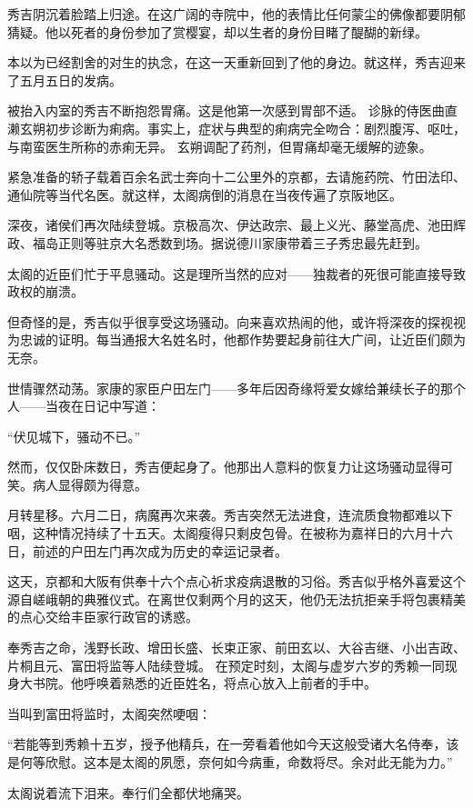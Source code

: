 \documentclass[
]{book}
\begin{document}
秀吉阴沉着脸踏上归途。在这广阔的寺院中，他的表情比任何蒙尘的佛像都要阴郁猜疑。他以死者的身份参加了赏樱宴，却以生者的身份目睹了醍醐的新绿。

本以为已经割舍的对生的执念，在这一天重新回到了他的身边。就这样，秀吉迎来了五月五日的发病。

被抬入内室的秀吉不断抱怨胃痛。这是他第一次感到胃部不适。
诊脉的侍医曲直濑玄朔初步诊断为痢病。事实上，症状与典型的痢病完全吻合：剧烈腹泻、呕吐，与南蛮医生所称的赤痢无异。
玄朔调配了药剂，但胃痛却毫无缓解的迹象。

紧急准备的轿子载着百余名武士奔向十二公里外的京都，去请施药院、竹田法印、通仙院等当代名医。就这样，太阁病倒的消息在当夜传遍了京阪地区。

深夜，诸侯们再次陆续登城。京极高次、伊达政宗、最上义光、藤堂高虎、池田辉政、福岛正则等驻京大名悉数到场。据说德川家康带着三子秀忠最先赶到。

太阁的近臣们忙于平息骚动。这是理所当然的应对------独裁者的死很可能直接导致政权的崩溃。

但奇怪的是，秀吉似乎很享受这场骚动。向来喜欢热闹的他，或许将深夜的探视视为忠诚的证明。每当通报大名姓名时，他都作势要起身前往大广间，让近臣们颇为无奈。

世情骤然动荡。家康的家臣户田左门------多年后因奇缘将爱女嫁给兼续长子的那个人------当夜在日记中写道：

``伏见城下，骚动不已。''

然而，仅仅卧床数日，秀吉便起身了。他那出人意料的恢复力让这场骚动显得可笑。病人显得颇为得意。

月转星移。六月二日，病魔再次来袭。秀吉突然无法进食，连流质食物都难以下咽，这种情况持续了十五天。太阁瘦得只剩皮包骨。在被称为嘉祥日的六月十六日，前述的户田左门再次成为历史的幸运记录者。

这天，京都和大阪有供奉十六个点心祈求疫病退散的习俗。秀吉似乎格外喜爱这个源自嵯峨朝的典雅仪式。在离世仅剩两个月的这天，他仍无法抗拒亲手将包裹精美的点心交给丰臣家行政官的诱惑。

奉秀吉之命，浅野长政、增田长盛、长束正家、前田玄以、大谷吉继、小出吉政、片桐且元、富田将监等人陆续登城。
在预定时刻，太阁与虚岁六岁的秀赖一同现身大书院。他呼唤着熟悉的近臣姓名，将点心放入上前者的手中。

当叫到富田将监时，太阁突然哽咽：

``若能等到秀赖十五岁，授予他精兵，在一旁看着他如今天这般受诸大名侍奉，该是何等欣慰。这本是太阁的夙愿，奈何如今病重，命数将尽。余对此无能为力。''

太阁说着流下泪来。奉行们全都伏地痛哭。
\end{document}
